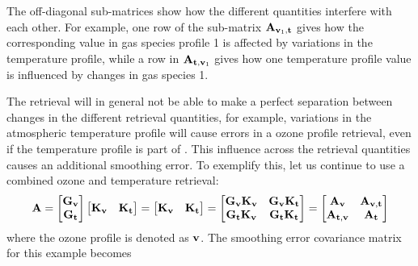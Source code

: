 The off-diagonal sub-matrices show how the different quantities interfere with
each other. For example, one row of the sub-matrix
$\mathbf{A}_{\mathbf{v}_1,\mathbf{t}}$ gives how the corresponding value in gas
species profile 1 is affected by variations in the temperature profile, while a
row in $\mathbf{A}_{\mathbf{t},\mathbf{v}_1}$ gives how one temperature profile
value is influenced by changes in gas species 1.

The retrieval will in general not be able to make a perfect separation between
changes in the different retrieval quantities, for example, variations in the
atmospheric temperature profile will cause errors in a ozone profile retrieval,
even if the temperature profile is part of \SttVct. This influence across the
retrieval quantities causes an additional smoothing error. To exemplify
this, let us continue to use a combined ozone and temperature retrieval:
\begin{displaymath}
  \mathbf{A}=  
  \begin{bmatrix}
    \mathbf{G}_{\mathbf{v}}\\\mathbf{G}_{\mathbf{t}}
  \end{bmatrix}
  \begin{bmatrix}
    \mathbf{K}_{\mathbf{v}} & \mathbf{K}_{\mathbf{t}}
  \end{bmatrix} =
  \begin{bmatrix}
    \mathbf{K}_{\mathbf{v}} & \mathbf{K}_{\mathbf{t}}
  \end{bmatrix} =
  \begin{bmatrix}
    \mathbf{G}_{\mathbf{v}}\mathbf{K}_{\mathbf{v}} &
    \mathbf{G}_{\mathbf{v}}\mathbf{K}_{\mathbf{t}} \\
    \mathbf{G}_{\mathbf{t}}\mathbf{K}_{\mathbf{v}} &
    \mathbf{G}_{\mathbf{t}}\mathbf{K}_{\mathbf{t}} \\
  \end{bmatrix} =
  \begin{bmatrix}
    \mathbf{A}_{\mathbf{v}} & \mathbf{A}_{\mathbf{v},\mathbf{t}} \\
    \mathbf{A}_{\mathbf{t},\mathbf{v}} & \mathbf{A}_{\mathbf{t}} 
  \end{bmatrix} 
\end{displaymath}
where the ozone profile is denoted as $\mathbf{v}$. The smoothing error
covariance matrix for this example becomes
